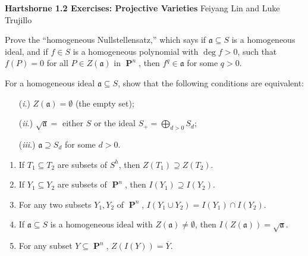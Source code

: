 \documentclass{/Users/SHER/Documents/Hartshorne-Exercises/hw_pset} %
\DeclareMathOperator{\pp}{\mathbf{P}} %
\newcommand{\header}[2]{
    {\noindent
    {\Large \bf Hartshorne #1 Exercises: #2}
    \hfill 
    {\large Feiyang Lin and Luke Trujillo}
    \vspace{0.5cm}}
}
\begin{document}
\header{1.2}{Projective Varieties}

\begin{exercise}[Exercise 2.1]
    Prove the ``homogeneous Nullstellensatz,'' which says if $\mathfrak{a}
    \subseteq S$ is a homogeneous ideal, and if $f \in S$ is a homogeneous
    polynomial with $\deg f > 0$, such that $f(P) = 0$ for all $P \in
    Z(\mathfrak{a})$ in $\pp^n$, then $f^q \in \mathfrak{a}$ for some $q >
    0$.
\end{exercise}

\begin{solution}

\end{solution}

\begin{exercise}[Exercise 2.2]
    For a homogeneous ideal $\mathfrak{a} \subseteq S$, show that the following
    conditions are equivalent:
    \begin{itemize}
        \item[(\emph{i}.)] $Z(\mathfrak{a}) = \emptyset$ (the empty set);
        \item[(\emph{ii}.)] $\sqrt{\mathfrak{a}} =$ either $S$ or the ideal $S_+ =
        \bigoplus_{d > 0}S_d$;
        \item[(\emph{iii}.)] $\mathfrak{a} \supseteq S_d$ for some $d > 0$. 
    \end{itemize}
\end{exercise}

\begin{solution}
    
\end{solution}

\begin{exercise}[Exercise 2.3]
    \begin{enumerate}
        \item If $T_1 \subseteq T_2$ are subsets of $S^h$, then $Z(T_1) \supseteq
        Z(T_2)$.
      \item If $Y_1 \subseteq Y_2$ are subsets of $\pp^n$, then $I(Y_1) \supseteq
        I(Y_2)$.
      \item For any two subsets $Y_1,Y_2$ of $\pp^n$, $I(Y_1 \cup Y_2) = I(Y_1)
        \cap I(Y_2)$.
      \item If $\mathfrak{a} \subseteq S$ is a homogeneous ideal with
        $Z(\mathfrak{a}) \ne \emptyset$, then $I(Z(\mathfrak{a})) =
        \sqrt{\mathfrak{a}}$.
      \item For any subset $Y \subseteq \pp^n$, $Z(I(Y)) = \overline{Y}$.
    \end{enumerate}
\end{exercise}
\end{document}

